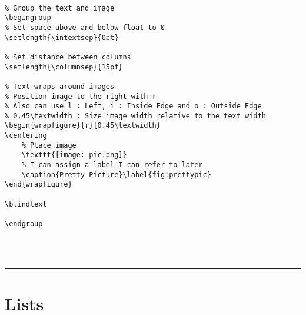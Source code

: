 \documentclass[a4paper,12pt,titlepage]{article}
\begin{document}
~\\
\begin{minipage}{\linewidth}
\begin{lstlisting}
% Group the text and image
\begingroup
% Set space above and below float to 0
\setlength{\intextsep}{0pt}

% Set distance between columns
\setlength{\columnsep}{15pt}

% Text wraps around images
% Position image to the right with r
% Also can use l : Left, i : Inside Edge and o : Outside Edge
% 0.45\textwidth : Size image width relative to the text width
\begin{wrapfigure}{r}{0.45\textwidth}
\centering
	% Place image
	\texttt{[image: pic.png]}
	% I can assign a label I can refer to later
	\caption{Pretty Picture}\label{fig:prettypic}
\end{wrapfigure}

\blindtext

\endgroup
\end{lstlisting}
\end{minipage}
~\\
\\
\rule{\linewidth}{0.1mm}






\section{Lists}
\end{document}
